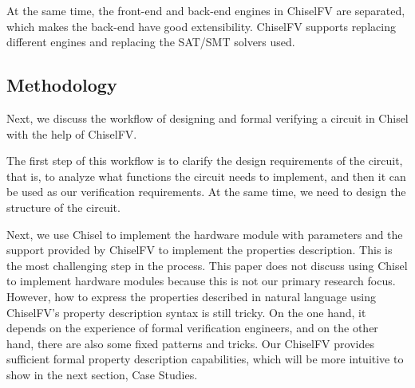 \documentclass[conference]{IEEEtran}
\theoremstyle{definition}
\begin{document}

At the same time, the front-end and back-end engines in ChiselFV are separated, which makes the back-end have good extensibility. ChiselFV supports replacing different engines and replacing the SAT/SMT solvers used.

\subsection{Methodology}

Next, we discuss the workflow of designing and formal verifying a circuit in Chisel with the help of ChiselFV.

The first step of this workflow is to clarify the design requirements of the circuit, that is, to analyze what functions the circuit needs to implement, and then it can be used as our verification requirements. At the same time, we need to design the structure of the circuit.

Next, we use Chisel to implement the hardware module with parameters and the support provided by ChiselFV to implement the properties description. This is the most challenging step in the process. This paper does not discuss using Chisel to implement hardware modules because this is not our primary research focus. However, how to express the properties described in natural language using ChiselFV's property description syntax is still tricky. On the one hand, it depends on the experience of formal verification engineers, and on the other hand, there are also some fixed patterns and tricks. Our ChiselFV provides sufficient formal property description capabilities, which will be more intuitive to show in the next section, Case Studies.
\end{document}
